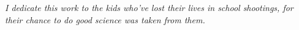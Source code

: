 \chapter*{}
\begin{center}
{\centering \it I dedicate this work to the kids who've lost their lives in school shootings, for their chance to do good science was taken from them.}
\end{center} 